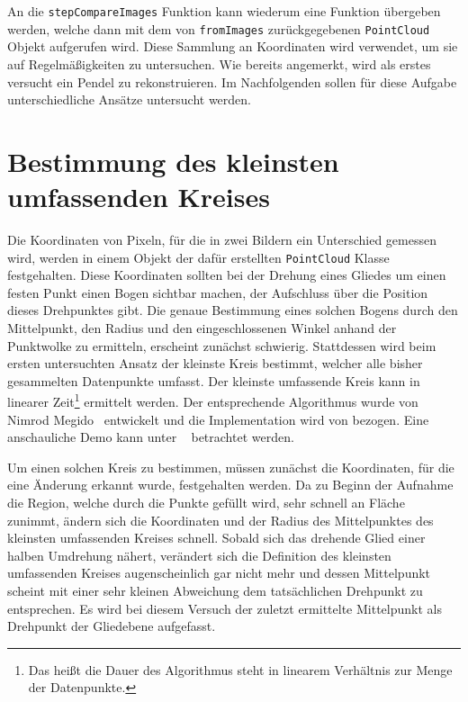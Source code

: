 An die \lstinline{stepCompareImages} Funktion kann wiederum eine Funktion übergeben werden, welche dann mit dem von \lstinline{fromImages} zurückgegebenen \lstinline{PointCloud} Objekt aufgerufen wird.
Diese Sammlung an Koordinaten wird verwendet, um sie auf Regelmä{\ss}igkeiten zu untersuchen.
Wie bereits angemerkt, wird als erstes versucht ein Pendel zu rekonstruieren.
Im Nachfolgenden sollen für diese Aufgabe unterschiedliche Ansätze untersucht werden.

\section{Bestimmung des kleinsten umfassenden Kreises}

Die Koordinaten von Pixeln, für die in zwei Bildern ein Unterschied gemessen wird, werden in einem Objekt der dafür erstellten \lstinline{PointCloud} Klasse festgehalten.
Diese Koordinaten sollten bei der Drehung eines Gliedes um einen festen Punkt einen Bogen sichtbar machen, der Aufschluss über die Position dieses Drehpunktes gibt.
Die genaue Bestimmung eines solchen Bogens durch den Mittelpunkt, den Radius und den eingeschlossenen Winkel anhand der Punktwolke zu ermitteln, erscheint zunächst schwierig.
Stattdessen wird beim ersten untersuchten Ansatz der kleinste Kreis bestimmt, welcher alle bisher gesammelten Datenpunkte umfasst.
Der kleinste umfassende Kreis kann in linearer Zeit\footnote{Das hei{\ss}t die Dauer des Algorithmus steht in linearem Verhältnis zur Menge der Datenpunkte.} ermittelt werden.
Der entsprechende Algorithmus wurde von Nimrod Megido~\cite{Megiddo1983} entwickelt und die Implementation wird von  bezogen.
Eine anschauliche Demo kann unter ~\cite{Nayuki2021} betrachtet werden.

Um einen solchen Kreis zu bestimmen, müssen zunächst die Koordinaten, für die eine Änderung erkannt wurde, festgehalten werden.
Da zu Beginn der Aufnahme die Region, welche durch die Punkte gefüllt wird, sehr schnell an Fläche zunimmt, ändern sich die Koordinaten und der Radius des Mittelpunktes des kleinsten umfassenden Kreises schnell.
Sobald sich das drehende Glied einer halben Umdrehung nähert, verändert sich die Definition des kleinsten umfassenden Kreises augenscheinlich gar nicht mehr und dessen Mittelpunkt scheint mit einer sehr kleinen Abweichung dem tatsächlichen Drehpunkt zu entsprechen.
Es wird bei diesem Versuch der zuletzt ermittelte Mittelpunkt als Drehpunkt der Gliedebene aufgefasst.

